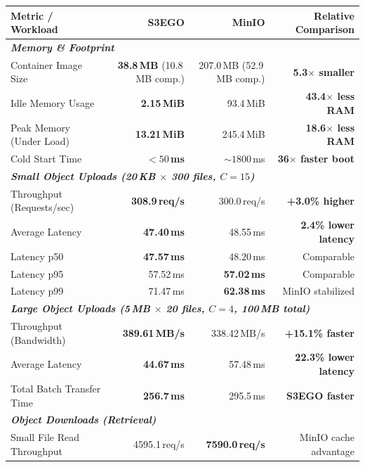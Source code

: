 \documentclass[11pt,a4paper]{article}
\begin{document}
\begin{table}[h!]
\centering
\small
\begin{tabularx}{\textwidth}{l r r r}
\toprule
\textbf{Metric / Workload} & \textbf{S3EGO} & \textbf{MinIO} & \textbf{Relative Comparison} \\
\midrule
\multicolumn{4}{l}{\textit{\textbf{Memory \& Footprint}}} \\
Container Image Size & \textbf{38.8\,MB} (10.8\,MB comp.) & 207.0\,MB (52.9\,MB comp.) & \textcolor{blue!80!black}{\textbf{5.3$\times$ smaller}} \\
Idle Memory Usage & \textbf{2.15\,MiB} & 93.4\,MiB & \textcolor{blue!80!black}{\textbf{43.4$\times$ less RAM}} \\
Peak Memory (Under Load) & \textbf{13.21\,MiB} & 245.4\,MiB & \textcolor{blue!80!black}{\textbf{18.6$\times$ less RAM}} \\
Cold Start Time & \textbf{$< 50$\,ms} & $\sim 1800$\,ms & \textcolor{blue!80!black}{\textbf{36$\times$ faster boot}} \\
\midrule
\multicolumn{4}{l}{\textit{\textbf{Small Object Uploads (20\,KB $\times$ 300 files, $C=15$)}}} \\
Throughput (Requests/sec) & \textbf{308.9\,req/s} & 300.0\,req/s & \textcolor{blue!80!black}{\textbf{+3.0\% higher}} \\
Average Latency & \textbf{47.40\,ms} & 48.55\,ms & \textcolor{blue!80!black}{\textbf{2.4\% lower latency}} \\
Latency p50 & \textbf{47.57\,ms} & 48.20\,ms & Comparable \\
Latency p95 & 57.52\,ms & \textbf{57.02\,ms} & Comparable \\
Latency p99 & 71.47\,ms & \textbf{62.38\,ms} & MinIO stabilized \\
\midrule
\multicolumn{4}{l}{\textit{\textbf{Large Object Uploads (5\,MB $\times$ 20 files, $C=4$, 100\,MB total)}}} \\
Throughput (Bandwidth) & \textbf{389.61\,MB/s} & 338.42\,MB/s & \textcolor{blue!80!black}{\textbf{+15.1\% faster}} \\
Average Latency & \textbf{44.67\,ms} & 57.48\,ms & \textcolor{blue!80!black}{\textbf{22.3\% lower latency}} \\
Total Batch Transfer Time & \textbf{256.7\,ms} & 295.5\,ms & \textbf{S3EGO faster} \\
\midrule
\multicolumn{4}{l}{\textit{\textbf{Object Downloads (Retrieval)}}} \\
Small File Read Throughput & 4595.1\,req/s & \textbf{7590.0\,req/s} & MinIO cache advantage \\

\end{tabularx}
\end{table}
\end{document}
